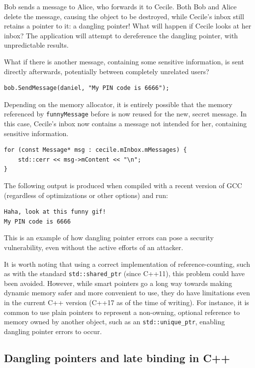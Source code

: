 Bob sends a message to Alice, who forwards it to Cecile. Both Bob and Alice delete the message, causing the object to be destroyed, while Cecile's inbox still retains a pointer to it: a dangling pointer! What will happen if Cecile looks at her inbox? The application will attempt to dereference the dangling pointer, with unpredictable results.

What if there is another message, containing some sensitive information, is sent directly afterwards, potentially between completely unrelated users?

\begin{lstlisting}
bob.SendMessage(daniel, "My PIN code is 6666");
\end{lstlisting}

Depending on the memory allocator, it is entirely possible that the memory referenced by \lstinline!funnyMessage! before is now reused for the new, secret message. In this case, Cecile's inbox now contains a message not intended for her, containing sensitive information.

\begin{lstlisting}
for (const Message* msg : cecile.mInbox.mMessages) {
	std::cerr << msg->mContent << "\n";
}
\end{lstlisting}

The following output is produced when compiled with a recent version of GCC (regardless of optimizations or other options) and run:

\begin{verbatim}
Haha, look at this funny gif!	
My PIN code is 6666
\end{verbatim}

This is an example of how dangling pointer errors can pose a security vulnerability, even without the active efforts of an attacker.

It is worth noting that using a correct implementation of reference-counting, such as with the standard \lstinline!std::shared_ptr! (since C++11), this problem could have been avoided. However, while smart pointers go a long way towards making dynamic memory safer and more convenient to use, they do have limitations even in the current C++ version (C++17 as of the time of writing). For instance, it is common to use plain pointers to represent a non-owning, optional reference to memory owned by another object, such as an \lstinline!std::unique_ptr!, enabling dangling pointer errors to occur.

\subsection{Dangling pointers and late binding in C++}

